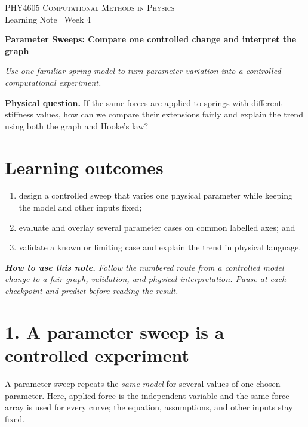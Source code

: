 \documentclass[11pt,a4paper]{article}
\newcommand{\course}{PHY4605 Computational Methods in Physics}
\begin{document}
{\large\textsc{\course}}\\[-2pt]
{\small Learning Note \textbar\ Week 4}\par\vspace{4pt}
{\LARGE\bfseries Parameter Sweeps: Compare one controlled change and interpret the graph}\par\vspace{3pt}
\textit{Use one familiar spring model to turn parameter variation into a controlled computational experiment.}

\begin{keybox}\textbf{Physical question.} If the same forces are applied to springs with different stiffness values, how can we compare their extensions fairly and explain the trend using both the graph and Hooke's law?\end{keybox}

\section*{Learning outcomes}
\begin{enumerate}[nosep,leftmargin=5mm]
\item design a controlled sweep that varies one physical parameter while keeping the model and other inputs fixed;
\item evaluate and overlay several parameter cases on common labelled axes; and
\item validate a known or limiting case and explain the trend in physical language.
\end{enumerate}

\textit{\textbf{How to use this note.} Follow the numbered route from a controlled model change to a fair graph, validation, and physical interpretation. Pause at each checkpoint and predict before reading the result.}

\section*{1. A parameter sweep is a controlled experiment}
A parameter sweep repeats the \emph{same model} for several values of one chosen parameter. Here, applied force is the independent variable and the same force array is used for every curve; the equation, assumptions, and other inputs stay fixed.
\end{document}
